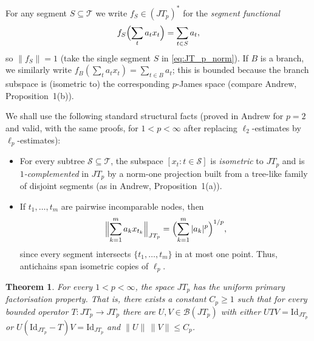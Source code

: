 \documentclass[11pt]{amsart}
\theoremstyle{plain}
\newtheorem{theorem}{Theorem}[section]
\theoremstyle{definition}
\numberwithin{equation}{section}
\newcommand{\Id}{\mathrm{Id}}
\renewcommand{\le}{\leqslant}
\renewcommand{\ge}{\geqslant}
\begin{document}
For any segment $S\subseteq\mathcal T$ we write $f_S\in (JT_p)^*$ for the \emph{segment functional}
\[
f_S\Bigl(\sum_{t}a_t x_t\Bigr)=\sum_{t\in S}a_t,
\]
so $\|f_S\|=1$ (take the single segment $S$ in \eqref{eq:JT_p_norm}).
If $B$ is a branch, we similarly write $f_B(\sum_t a_t x_t)=\sum_{t\in B}a_t$; this is bounded because
the branch subspace is (isometric to) the corresponding $p$-James space (compare Andrew, Proposition~1(b)).

We shall use the following standard structural facts (proved in Andrew for $p=2$ and valid, with the same proofs,
for $1<p<\infty$ after replacing $\ell_2$-estimates by $\ell_p$-estimates):
\begin{itemize}
\item[(i)] For every subtree $\mathcal S\subseteq\mathcal T$, the subspace $[x_t:t\in\mathcal S]$ is \emph{isometric} to $JT_p$
and is \emph{$1$-complemented} in $JT_p$ by a norm-one projection built from a tree-like family of disjoint segments
(as in Andrew, Proposition~1(a)).
\item[(ii)] If $t_1,\dots,t_m$ are pairwise incomparable nodes, then
\[
\Bigl\|\sum_{k=1}^m a_k x_{t_k}\Bigr\|_{JT_p}=\Bigl(\sum_{k=1}^m |a_k|^p\Bigr)^{1/p},
\]
since every segment intersects $\{t_1,\dots,t_m\}$ in at most one point.
Thus, antichains span isometric copies of $\ell_p$.
\end{itemize}

\begin{theorem}\label{thm:JT_p_UPFP}
For every $1<p<\infty$, the space $JT_p$ has the uniform primary factorisation property.
That is, there exists a constant $C_p\ge 1$ such that for every bounded operator
$T\colon JT_p\to JT_p$ there are $U,V\in\mathscr B(JT_p)$ with either
$UTV=\Id_{JT_p}$ or $U(\Id_{JT_p}-T)V=\Id_{JT_p}$ and $\|U\|\,\|V\|\le C_p$.
\end{theorem}
\end{document}

